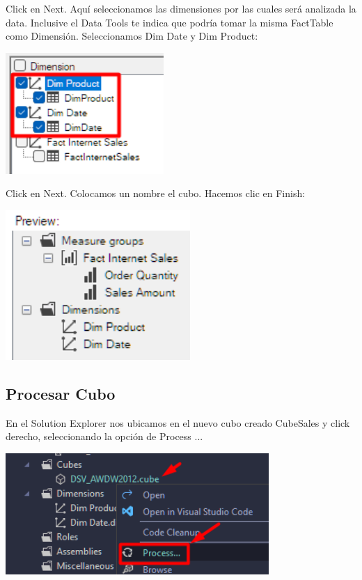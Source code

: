 \documentclass[12pt,letterpaper]{article}
\begin{document}
Click en Next.
Aquí seleccionamos las dimensiones por las cuales será analizada la data. Inclusive el Data Tools te indica que podría tomar la misma FactTable como Dimensión. Seleccionamos Dim Date y Dim Product:

\begin{center}
    \includegraphics[width=6cm]{./img/img16.png}
\end{center}

Click en Next. Colocamos un nombre el cubo. Hacemos clic en Finish:

\begin{center}
    \includegraphics[width=7cm]{./img/img17.png}
\end{center}

\subsection{Procesar Cubo}

En el Solution Explorer nos ubicamos en el nuevo cubo creado CubeSales y click derecho, seleccionando la opción de Process ...

\begin{center}
    \includegraphics[width=10cm]{./img/img18.png}
\end{center}
\end{document}
